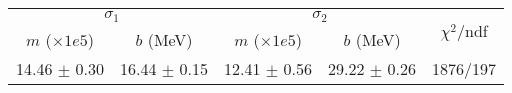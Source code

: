\begin{tabular}{cc|cc||c}
\multicolumn{2}{c|}{$\sigma_1$} & \multicolumn{2}{|c}{$\sigma_2$}  & \multirow{2}{*}{$\chi^2/$ndf}\\
$m$ ($\times1e5$) & $b$ (MeV) & $m$ ($\times1e5$) & $b$ (MeV)  & \\
\hline
14.46 $\pm$ 0.30 & 16.44 $\pm$ 0.15 & 12.41 $\pm$ 0.56 & 29.22 $\pm$ 0.26 & 1876/197\\
\end{tabular}
